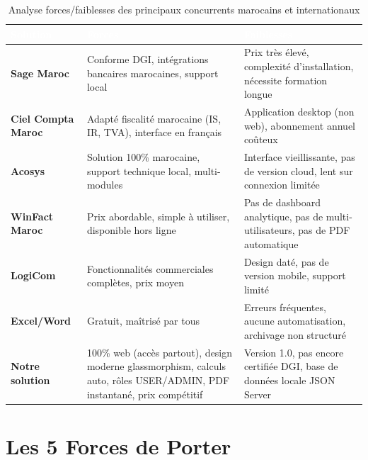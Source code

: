 \documentclass[12pt,a4paper]{report}
\begin{document}
\begin{table}[H]
\centering
\caption{Analyse forces/faiblesses des principaux concurrents marocains et internationaux}
\label{tab:analyse_concurrents}
\begin{tabularx}{\textwidth}{|l|X|X|}
\hline
\rowcolor{emsiblue}\textcolor{white}{\textbf{Solution}} & \textcolor{white}{\textbf{Forces}} & \textcolor{white}{\textbf{Faiblesses}} \\
\hline
\textbf{Sage Maroc} & Conforme DGI, intégrations bancaires marocaines, support local & Prix très élevé, complexité d'installation, nécessite formation longue \\
\textbf{Ciel Compta Maroc} & Adapté fiscalité marocaine (IS, IR, TVA), interface en français & Application desktop (non web), abonnement annuel coûteux \\
\textbf{Acosys} & Solution 100\% marocaine, support technique local, multi-modules & Interface vieillissante, pas de version cloud, lent sur connexion limitée \\
\textbf{WinFact Maroc} & Prix abordable, simple à utiliser, disponible hors ligne & Pas de dashboard analytique, pas de multi-utilisateurs, pas de PDF automatique \\
\textbf{LogiCom} & Fonctionnalités commerciales complètes, prix moyen & Design daté, pas de version mobile, support limité \\
\textbf{Excel/Word} & Gratuit, maîtrisé par tous & Erreurs fréquentes, aucune automatisation, archivage non structuré \\
\textbf{Notre solution} & 100\% web (accès partout), design moderne glassmorphism, calculs auto, rôles USER/ADMIN, PDF instantané, prix compétitif & Version 1.0, pas encore certifiée DGI, base de données locale JSON Server \\
\hline
\end{tabularx}
\end{table}

\section{Les 5 Forces de Porter}
\end{document}
